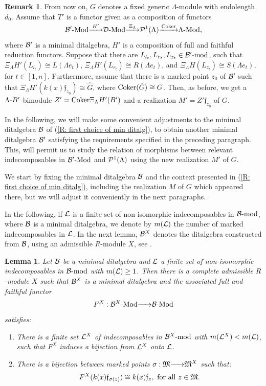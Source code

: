 \documentclass{article}
\newtheorem{lemma}[theorem]{Lemma}
\theoremstyle{definition}
\newtheorem{remark}[theorem]{Remark}
\newcommand{\Coker}{{ \rm Coker }}
\newcommand{\Mod}{{ \rm Mod }}
\renewcommand{\frak}{\mathfrak}
\newcommand{\g}{\hbox{-}}
\renewcommand{\mod}{{\rm mod }}
\newcommand{\rightmap}[1]{\smash{\mathop{\hbox to 
20pt{\rightarrowfill}}\limits^{#1}}}
\begin{document}
\begin{remark}\label{R: variar parametrizaciones} From now on, 
$G$ denotes a fixed generic $\Lambda$-module  with endolength $d_0$. Assume that $T'$ is a functor  given as a composition 
of functors 
$${\cal B}'\g\Mod\rightmap{H'}{\cal D}\g\Mod\rightmap{\Xi_\Lambda}{\cal P}^1(\Lambda)\rightmap{ \ \Coker \ }\Lambda\g\Mod,$$
where ${\cal B}'$ is a minimal ditalgebra, $H'$ is a composition of full and faithful reduction functors. Suppose that 
 there are $L_{l_t}, L_{r_t}, L_{z_t}\in {\cal B}'\g\mod$, such that $\Xi_\Lambda H'(L_{l_t})\cong L(\Lambda e_t)$, $\Xi_\Lambda H'(L_{r_t})\cong R(\Lambda e_t)$, and $\Xi_\Lambda H(L_{z_t})\cong S(\Lambda e_t)$, for $t\in [1,n]$. Furthermore, assume that there is a marked point $z_0$ of ${\cal B}'$ such that $\Xi_\Lambda H'(k(x)\frak{f}_{z_0})\cong \hat{G}$, where $\Coker (\hat{G})\cong G$. Then, as before, we get a $\Lambda\g B'$-bimodule $Z'=\Coker \Xi_\Lambda H'(B')$ and a realization $M'=Z'\frak{f}_{z_0}$ of $G$. 
 
 In the following, we will make some convenient adjustments to the minimal ditalgebra ${\cal B}$ of (\ref{R: first choice of min ditalg}), to obtain another minimal ditalgebra ${\cal B}'$ satisfying the requirements specified in the preceding paragraph. This, will permit us to 
study the relation of morphisms between relevant  indecomposables in ${\cal B}'\g\Mod$ and ${\cal P}^1(\Lambda)$ using the new realization $M'$ of $G$. 

We start by fixing the minimal ditalgebra ${\cal B}$ and the context  presented in (\ref{R: first choice of min ditalg}), including the realization $M$ of $G$  which appeared there, but we will adjust it conveniently in the next paragraphs.  
\end{remark}


In the following, if ${\cal L}$ is a finite set of non-isomorphic indecomposables in ${\cal B}\g\mod$, where ${\cal B}$ is a minimal ditalgebra, we denote by $m({\cal L})$ the number of marked indecomposables in ${\cal L}$. In the next lemma, ${\cal B}^X$ denotes the ditalgebra constructed from ${\cal B}$, using  an admissible $R$-module $X$, see \cite[\S12]{BSZ}. 


\begin{lemma}\label{L reemplazando marcados} Let ${\cal B}$ be a minimal ditalgebra and ${\cal L}$ a finite set of non-isomorphic indecomposables in ${\cal B}\g\mod$ with $m({\cal L})\geq 1$. Then there is a complete admissible $R$-module $X$ such that  ${\cal B}^X$ is a minimal ditalgebra and the associated  
full and faithful functor 
$$F^X: {\cal B}^X\g\Mod\rightmap{}{\cal B}\g\Mod$$ 
satisfies: 
\begin{enumerate}
\item  There is a finite set ${\cal L}^X$ of indecomposables in ${\cal B}^X\g\mod$ with $m({\cal L}^X)<m({\cal L})$, such that $F^X$ induces a bijection from ${\cal L}^X$ onto ${\cal L}$.
\item There is a bijection between marked points $\sigma:\frak{M}\rightmap{}\frak{M}^X$ such that:  
 $$F^X(k(x)\frak{f}_{\sigma(z)})\cong k(x)\frak{f}_z, \hbox{ for all } z\in \frak{M}.$$ 
\end{enumerate} 
\end{lemma}
\end{document}
